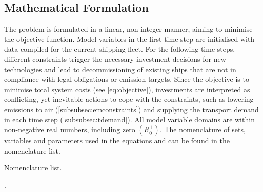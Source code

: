 \documentclass[article]{elsarticle}
\begin{document}
\subsection{Mathematical Formulation}
\label{subsec:Mat}
The problem is formulated in a linear, non-integer manner, aiming to minimise the objective function. Model variables in the first time step are initialised with data compiled for the current shipping fleet. For the following time steps, different constraints trigger the necessary investment decisions for new technologies and lead to decommissioning of existing ships that are not in compliance with legal obligations or emission targets. Since the objective is to minimise total system costs  (see \autoref{eq:objective}), investments are interpreted as conflicting, yet inevitable actions to cope with the constraints, such as lowering emissions to air (\autoref{subsubsec:emconstraints}) and supplying the transport demand in each time step (\autoref{subsubsec:tdemand}). All model variable domains are within non-negative real numbers, including zero $\left(R_{0}^{+}\right)$. The nomenclature of sets, variables and parameters used in the equations and can be found in the nomenclature list.
\glsdisablehyper
\glsaddall
\begin{table}[h]
\begin{mdframed}
\footnotesize{
\begin{multicols}{2}
\printglossary[style=tree,type=a]
\vspace{-0.3cm}
\printglossary[style=tree,type=s]
\vspace{-0.3cm}
\printglossary[style=tree,type=v]
\vspace{-0.3cm}
\printglossary[style=tree,type=p]
\end{multicols}
}
\end{mdframed}
\caption*{Nomenclature list.}
\label{box:nomenclature}.
\end{table}
\end{document}
